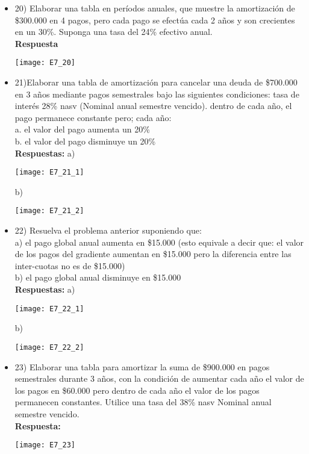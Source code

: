 \begin{itemize}
	\item 20)	 Elaborar una tabla en períodos anuales, que muestre la amortización de \$300.000 en 4 pagos, pero cada pago se efectúa cada 2 años y son crecientes en un 30\%. Suponga una tasa del 24\% efectivo anual.\\
	\textbf{Respuesta}
	\begin{center}
		\texttt{[image: E7\_20]}
	\end{center}
	\medskip
	
	\item 21)Elaborar una tabla de amortización para cancelar una deuda de \$700.000 en 3 años mediante pagos semestrales bajo las siguientes condiciones: tasa de interés 28\% nasv (Nominal anual semestre vencido). dentro de cada año, el pago permanece constante pero; cada año:\\
	
	a.	el valor del pago aumenta un 20\% \\
	b.	el valor del pago disminuye un 20\% \\
	\textbf{Respuestas:}
	a)
	\begin{center}
		\texttt{[image: E7\_21\_1]}
	\end{center}
	b)
	\begin{center}
		\texttt{[image: E7\_21\_2]}
	\end{center}
	\medskip
	
	\item 22) Resuelva el problema anterior suponiendo que:\\
	
	a)	el pago global anual aumenta en \$15.000 (esto equivale a decir que: el valor de los pagos del gradiente aumentan en \$15.000 pero la diferencia entre las inter-cuotas no es de \$15.000) \\
	b)	el pago global anual disminuye en \$15.000\\
	\textbf{ Respuestas:}
	a)
	\begin{center}
		\texttt{[image: E7\_22\_1]}
	\end{center}
	b)
	\begin{center}
		\texttt{[image: E7\_22\_2]}
	\end{center}
	\medskip
	
	\item 23) Elaborar una tabla para amortizar la suma de \$900.000 en pagos semestrales durante 3 años, con la condición de aumentar cada año el valor de los pagos en \$60.000 pero dentro de cada año el valor de los pagos permanecen constantes. Utilice una tasa del 38\% nasv Nominal anual semestre vencido.\\
	\textbf{Respuesta:}\\
	\begin{center}
		\texttt{[image: E7\_23]}
	\end{center}
	\medskip
	

\end{itemize}
